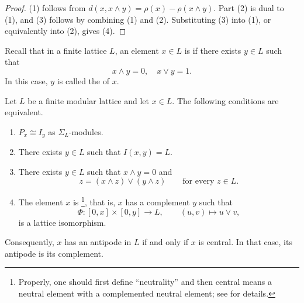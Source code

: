 \documentclass[a4paper,leqno]{amsart}
\begin{document}
\begin{proof}
(1) follows from $d(x,x\wedge y)=\rho(x)-\rho(x\wedge y)$. Part (2) is dual to (1), and (3) follows by combining (1) and (2). Substituting (3) into (1), or equivalently into (2), gives (4).
\end{proof}

Recall that in a finite lattice $L$, an element $x\in L$ is  if there exists $y\in L$ such that \[ x\wedge y =0, \quad x\vee y=1.\]
In this case, $y$ is called the  of $x$.

\begin{lem}\label{lem:modular-lattice-central-antipode}
Let $L$ be a finite modular lattice and let $x\in L$. The following
conditions are equivalent.
\begin{enumerate}
\item $P_x \cong I_y$ as $\Sigma_L$-modules.
    \item There exists $y\in L$ such that $I(x,y)=L$.
    \item There exists $y\in L$ such that $x\wedge y=0$ and
    \[
    z=(x\wedge z)\vee(y\wedge z)
    \qquad\text{for every }z\in L.
    \]
    \item The element $x$ is \footnote{Properly, one should first define ``neutrality'' and then central means a neutral element with a complemented neutral element; see \cite[III.1]{Gra03} for details.}, that is, $x$ has a complement $y$ such that
    \[
    \Phi:[0,x]\times[0,y]\longrightarrow L,
    \qquad (u,v)\longmapsto u\vee v,
    \]
    is a lattice isomorphism.
\end{enumerate}
Consequently, $x$ has an antipode in $L$ if and only if $x$ is central. 
In that case, its antipode is its complement.
\end{lem}
\end{document}
